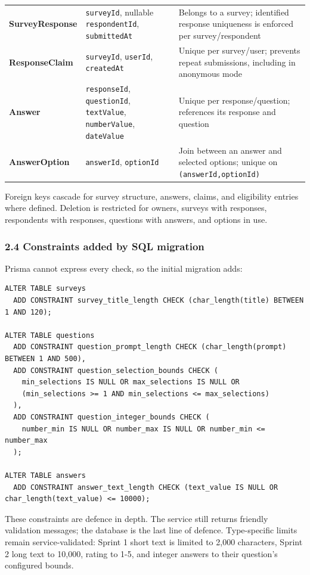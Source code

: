 \documentclass[12pt,a4paper]{article}
\begin{document}
{\begin{longtable}{@{}>{\raggedright\arraybackslash}p{}>{\raggedright\arraybackslash}p{}>{\raggedright\arraybackslash}p{}@{}}
\textbf{SurveyResponse} & \texttt{surveyId}, nullable \texttt{respondentId}, \texttt{submittedAt} & Belongs to a survey; identified response uniqueness is enforced per survey/respondent \\
\textbf{ResponseClaim} & \texttt{surveyId}, \texttt{userId}, \texttt{createdAt} & Unique per survey/user; prevents repeat submissions, including in anonymous mode \\
\textbf{Answer} & \texttt{responseId}, \texttt{questionId}, \texttt{textValue}, \texttt{numberValue}, \texttt{dateValue} & Unique per response/question; references its response and question \\
\textbf{AnswerOption} & \texttt{answerId}, \texttt{optionId} & Join between an answer and selected options; unique on \texttt{(answerId,optionId)} \\
\end{longtable}}

Foreign keys cascade for survey structure, answers, claims, and eligibility entries where defined. Deletion is restricted for owners, surveys with responses, respondents with responses, questions with answers, and options in use.

\subsubsection*{2.4 Constraints added by SQL migration}
Prisma cannot express every check, so the initial migration adds:

\begin{lstlisting}
ALTER TABLE surveys
  ADD CONSTRAINT survey_title_length CHECK (char_length(title) BETWEEN 1 AND 120);

ALTER TABLE questions
  ADD CONSTRAINT question_prompt_length CHECK (char_length(prompt) BETWEEN 1 AND 500),
  ADD CONSTRAINT question_selection_bounds CHECK (
    min_selections IS NULL OR max_selections IS NULL OR
    (min_selections >= 1 AND min_selections <= max_selections)
  ),
  ADD CONSTRAINT question_integer_bounds CHECK (
    number_min IS NULL OR number_max IS NULL OR number_min <= number_max
  );

ALTER TABLE answers
  ADD CONSTRAINT answer_text_length CHECK (text_value IS NULL OR char_length(text_value) <= 10000);
\end{lstlisting}

These constraints are defence in depth. The service still returns friendly validation messages; the database is the last line of defence. Type-specific limits remain service-validated: Sprint 1 short text is limited to 2,000 characters, Sprint 2 long text to 10,000, rating to 1-5, and integer answers to their question's configured bounds.
\end{document}
